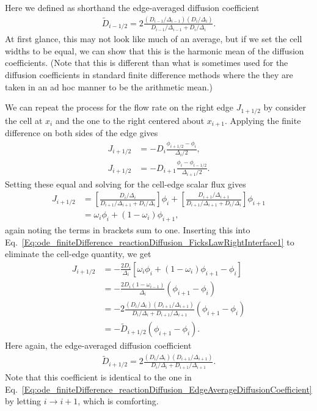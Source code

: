 Here we defined as shorthand the edge-averaged diffusion coefficient
\begin{align}
  \widetilde{D}_{i-1/2} = 2 \frac{ ( D_{i-1} / \Delta_{i-1} ) ( D_i / \Delta_i ) }{ D_{i-1} / \Delta_{i-1} + D_i / \Delta_i } . \label{Eq:ode_finiteDifference_reactionDiffusion_EdgeAverageDiffusionCoefficient}
\end{align}
At first glance, this may not look like much of an average, but if we set the cell widths to be equal, we can show that this is the harmonic mean of the diffusion coefficients. (Note that this is different than what is sometimes used for the diffusion coefficients in standard finite difference methods where the they are taken in an ad hoc manner to be the arithmetic mean.)

We can repeat the process for the flow rate on the right edge $J_{1+1/2}$ by consider the cell at $x_i$ and the one to the right centered about $x_{i+1}$. Applying the finite difference on both sides of the edge gives
\begin{subequations}
\begin{align}
  J_{i+1/2} &= -D_{i}   \frac{ \phi_{i+1/2} - \phi_{i} 		}{ \Delta_{i}/2 	}, \label{Eq:ode_finiteDifference_reactionDiffusion_FicksLawRightInterface1} \\
  J_{i+1/2} &= -D_{i+1} \frac{ \phi_{i} 	- \phi_{i-1/2}  }{ \Delta_{i+1}/2 	}.
\end{align}
\end{subequations}
Setting these equal and solving for the cell-edge scalar flux gives
\begin{align}
  J_{i+1/2} &=  \left[ \frac{ D_i / \Delta_i }{ D_{i+1}/\Delta_{i+1} + D_{i}/\Delta_{i} } \right] \phi_i + \left[ \frac{ D_{i+1} / \Delta_{i+1} }{ D_{i+1}/\Delta_{i+1} + D_{i}/\Delta_{i} } \right] \phi_{i+1} \nonumber \\
  &= \omega_i \phi_i + ( 1 - \omega_i ) \phi_{i+1},
\end{align}
again noting the terms in brackets sum to one. Inserting this into Eq.~\eqref{Eq:ode_finiteDifference_reactionDiffusion_FicksLawRightInterface1} to eliminate the cell-edge quantity, we get
\begin{align}
  J_{i+1/2} &= -\frac{2 D_{i}}{\Delta_i} \left[ \omega_i \phi_i + ( 1 - \omega_i ) \phi_{i+1} - \phi_{i}  \right] \nonumber \\
  			&= -\frac{2 D_{i} ( 1- \omega_{i-1} ) }{\Delta_i} ( \phi_{i+1} - \phi_i ) \nonumber \\
			&= -2 \frac{ ( D_{i} / \Delta_{i} ) ( D_{i+1} / \Delta_{i+1} ) }{ D_{i} / \Delta_{i} + D_{i+1} / \Delta_{i+1} } ( \phi_{i+1} - \phi_{i} ) \nonumber \\
			&= -\widetilde{D}_{i+1/2} ( \phi_{i+1} - \phi_{i} ) .
\end{align}
Here again, the edge-averaged diffusion coefficient
\begin{align}
  \widetilde{D}_{i+1/2} = 2 \frac{ ( D_{i} / \Delta_{i} ) ( D_{i+1} / \Delta_{i+1} ) }{ D_{i} / \Delta_{i} + D_{i+1} / \Delta_{i+1} } .
\end{align}
Note that this coefficient is identical to the one in Eq.~\eqref{Eq:ode_finiteDifference_reactionDiffusion_EdgeAverageDiffusionCoefficient} by letting $i \rightarrow i+1$, which is comforting.

